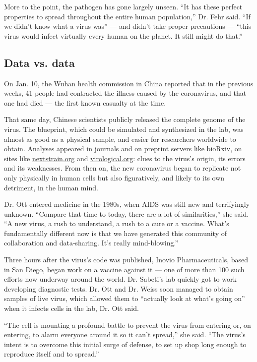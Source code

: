 More to the point, the pathogen has gone largely unseen. ``It has these
perfect properties to spread throughout the entire human population,''
Dr. Fehr said. ``If we didn't know what a virus was'' --- and didn't
take proper precautions --- ``this virus would infect virtually every
human on the planet. It still might do that.''

\hypertarget{data-vs-data}{%
\subsection{Data vs. data}\label{data-vs-data}}

On Jan. 10, the Wuhan health commission in China reported that in the
previous weeks, 41 people had contracted the illness caused by the
coronavirus, and that one had died --- the first known casualty at the
time.

That same day, Chinese scientists publicly released the complete genome
of the virus. The blueprint, which could be simulated and synthesized in
the lab, was almost as good as a physical sample, and easier for
researchers worldwide to obtain. Analyses appeared in journals and on
preprint servers like bioRxiv, on sites like
\href{https://nextstrain.org/}{nextstrain.org} and
\href{http://virological.org/}{virological.org}: clues to the virus's
origin, its errors and its weaknesses. From then on, the new coronavirus
began to replicate not only physically in human cells but also
figuratively, and likely to its own detriment, in the human mind.

Dr. Ott entered medicine in the 1980s, when AIDS was still new and
terrifyingly unknown. ``Compare that time to today, there are a lot of
similarities,'' she said. ``A new virus, a rush to understand, a rush to
a cure or a vaccine. What's fundamentally different now is that we have
generated this community of collaboration and data-sharing. It's really
mind-blowing.''

Three hours after the virus's code was published, Inovio
Pharmaceuticals, based in San Diego,
\href{https://www.voanews.com/science-health/coronavirus-outbreak/new-tech-could-make-corona}{began
work} on a vaccine against it --- one of more than 100 such efforts now
underway around the world. Dr. Sabeti's lab quickly got to work
developing diagnostic tests. Dr. Ott and Dr. Weiss soon managed to
obtain samples of live virus, which allowed them to ``actually look at
what's going on'' when it infects cells in the lab, Dr. Ott said.

``The cell is mounting a profound battle to prevent the virus from
entering or, on entering, to alarm everyone around it so it can't
spread,'' she said. ``The virus's intent is to overcome this initial
surge of defense, to set up shop long enough to reproduce itself and to
spread.''

